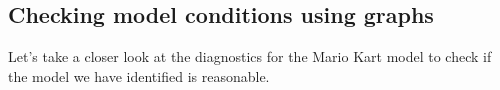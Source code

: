 

\subsection{Checking model conditions using graphs}

\noindent%
Let's take a closer look at the diagnostics for the Mario Kart
model to check if the model we have identified is reasonable.

